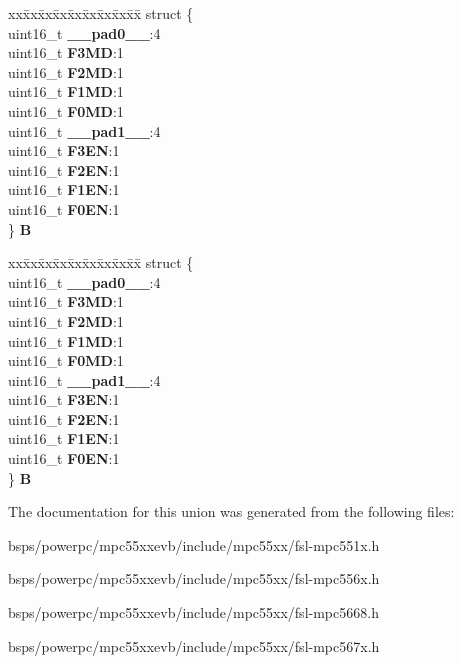 \begin{DoxyCompactItemize}
\begin{tabbing}
\end{tabbing}\item 
\mbox{\label{unionuRFRFCTR_aa17321d76f9218947d0e99999dffabad}} 
\begin{tabbing}
xx\=xx\=xx\=xx\=xx\=xx\=xx\=xx\=xx\=\kill
struct \{\\
\>uint16\_t {\bfseries \_\_pad0\_\_}:4\\
\>uint16\_t {\bfseries F3MD}:1\\
\>uint16\_t {\bfseries F2MD}:1\\
\>uint16\_t {\bfseries F1MD}:1\\
\>uint16\_t {\bfseries F0MD}:1\\
\>uint16\_t {\bfseries \_\_pad1\_\_}:4\\
\>uint16\_t {\bfseries F3EN}:1\\
\>uint16\_t {\bfseries F2EN}:1\\
\>uint16\_t {\bfseries F1EN}:1\\
\>uint16\_t {\bfseries F0EN}:1\\
\} {\bfseries B}\\

\end{tabbing}\item 
\mbox{\label{unionuRFRFCTR_ada412c6cc2e0d59fcd81c3e807a348bf}} 
\begin{tabbing}
xx\=xx\=xx\=xx\=xx\=xx\=xx\=xx\=xx\=\kill
struct \{\\
\>uint16\_t {\bfseries \_\_pad0\_\_}:4\\
\>uint16\_t {\bfseries F3MD}:1\\
\>uint16\_t {\bfseries F2MD}:1\\
\>uint16\_t {\bfseries F1MD}:1\\
\>uint16\_t {\bfseries F0MD}:1\\
\>uint16\_t {\bfseries \_\_pad1\_\_}:4\\
\>uint16\_t {\bfseries F3EN}:1\\
\>uint16\_t {\bfseries F2EN}:1\\
\>uint16\_t {\bfseries F1EN}:1\\
\>uint16\_t {\bfseries F0EN}:1\\
\} {\bfseries B}\\

\end{tabbing}\end{DoxyCompactItemize}


The documentation for this union was generated from the following files\+:\begin{DoxyCompactItemize}
\item 
bsps/powerpc/mpc55xxevb/include/mpc55xx/fsl-\/mpc551x.\+h\item 
bsps/powerpc/mpc55xxevb/include/mpc55xx/fsl-\/mpc556x.\+h\item 
bsps/powerpc/mpc55xxevb/include/mpc55xx/fsl-\/mpc5668.\+h\item 
bsps/powerpc/mpc55xxevb/include/mpc55xx/fsl-\/mpc567x.\+h\end{DoxyCompactItemize}

